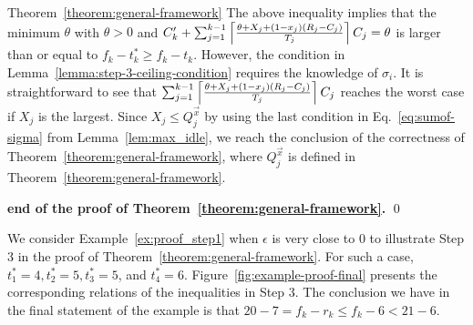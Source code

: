 \begin{appProof}{Theorem~\ref{theorem:general-framework}}
The above inequality implies that the minimum $\theta$ with $\theta > 0$ and
$C_k'+\sum_{j=1}^{k-1} \left\lceil{\frac{\theta+X_j+(1-x_j)(R_j-C_j)}{T_j}}\right\rceil C_j = \theta$
 is larger than or equal to $f_k-t_k^* \geq f_k-t_k$. 
However, the condition in Lemma~\ref{lemma:step-3-ceiling-condition} requires the knowledge of $\sigma_i$. It is straightforward to see that $\sum_{j=1}^{k-1} \left\lceil{\frac{\theta+X_j+(1-x_j)(R_j-C_j)}{T_j}}\right\rceil C_j$ reaches the worst case if $X_j$ is the largest. Since $X_j \leq Q_j^{\vec{x}}$ by using the last condition in Eq.~\eqref{eq:sumof-sigma} from Lemma~\ref{lem:max_idle}, we reach the conclusion of the correctness of Theorem~\ref{theorem:general-framework}, where  $Q_j^{\vec{x}}$ is defined in Theorem~\ref{theorem:general-framework}.

\hfill {\bf end of the proof of Theorem~\ref{theorem:general-framework}.} \qed  

\begin{example}
  We consider Example~\ref{ex:proof_step1} when $\epsilon$ is very
  close to $0$ to illustrate Step 3 in the proof of
  Theorem~\ref{theorem:general-framework}. For such a case, $t_1^*=4,
  t_2^*=5, t_3^*=5$, and $t_4^*=6$.
  Figure~\ref{fig:example-proof-final} presents the corresponding
  relations of the inequalities in Step 3.
The conclusion we have in the final statement of the example is that $20-7=f_k-r_k \leq  f_k-6 < 21-6$.
\end{example}
\vspace{-0.3in}
\end{appProof}





